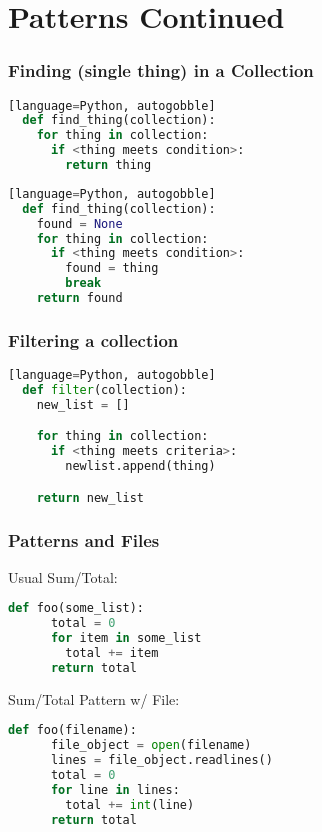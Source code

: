 \documentclass{beamer}
\begin{document}
%
%
\section{Patterns Continued}
\begin{frame}[fragile]
  \frametitle{Finding (single thing) in a Collection}
  \begin{lstlisting}[language=Python, autogobble][language=Python, autogobble]
  def find_thing(collection):
    for thing in collection:
      if <thing meets condition>:
        return thing
  \end{lstlisting}
  \vfill
  \begin{lstlisting}[language=Python, autogobble][language=Python, autogobble]
  def find_thing(collection):
    found = None
    for thing in collection:
      if <thing meets condition>:
        found = thing
        break
    return found
  \end{lstlisting}
\end{frame}

%
%
\begin{frame}[fragile]
  \frametitle{Filtering a collection}
  \begin{lstlisting}[language=Python, autogobble][language=Python, autogobble]
  def filter(collection):
    new_list = []

    for thing in collection:
      if <thing meets criteria>:
        newlist.append(thing)

    return new_list
  \end{lstlisting}
\end{frame}

%
%
\begin{frame}[fragile]
  \frametitle{Patterns and Files}
  \begin{minipage}{0.38\textwidth}
    Usual Sum/Total:
    \begin{lstlisting}[language=Python, autogobble]
    def foo(some_list):
      total = 0
      for item in some_list
        total += item
      return total
    \end{lstlisting}
  \end{minipage}
  \hfill
  \begin{minipage}{0.58\textwidth}
    Sum/Total Pattern w/ File:
    \begin{lstlisting}[language=Python, autogobble]
    def foo(filename):
      file_object = open(filename)
      lines = file_object.readlines()
      total = 0
      for line in lines:
        total += int(line)
      return total
    \end{lstlisting}
  \end{minipage}
\end{frame}
\end{document}
